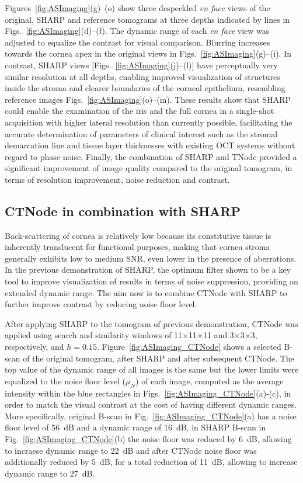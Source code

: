 Figures~\ref{fig:ASImaging}(g)--(o) show three despeckled \textit{en face} views of the original, SHARP and reference tomograms at three depths indicated by lines in Figs.~\ref{fig:ASImaging}(d)--(f). The dynamic range of each \textit{en face} view was adjusted to equalize the contrast for visual comparison. Blurring increases towards the cornea apex in the original views in Figs.~\ref{fig:ASImaging}(g)--(i). In contrast, SHARP views [Figs.~\ref{fig:ASImaging}(j)--(l)] have perceptually very similar resolution at all depths, enabling improved visualization of structures inside the stroma and clearer boundaries of the corneal epithelium, resembling reference images Figs.~\ref{fig:ASImaging}(o)--(m). These results show that SHARP could enable the examination of the iris and the full cornea in a single-shot acquisition with higher lateral resolution than currently possible, facilitating the accurate determination of parameters of clinical interest such as the stromal demarcation line and tissue layer thicknesses with existing OCT systems without regard to phase noise. Finally, the combination of SHARP and TNode provided a significant improvement of image quality compared to the original tomogram, in terms of resolution improvement, noise reduction and contrast.

\subsection{CTNode in combination with SHARP}

Back-scattering of cornea is relatively low because its constitutive tissue is inherently translucent for functional purposes, making that cornea stroma generally exhibits low to medium SNR, even lower in the presence of aberrations. In the previous demonstration of SHARP, the optimum filter shown to be a key tool to improve visualization of results in terms of noise suppression, providing an extended dynamic range. The aim now is to combine CTNode with SHARP to further improve contrast by reducing noise floor level.

After applying SHARP to the tomogram of previous demonstration, CTNode was applied using search and similarity windows of 11$\times$11$\times$11 and 3$\times$3$\times$3, respectively, and $h = 0.15$. Figure~\ref{fig:ASImaging_CTNode} shows a selected B-scan of the original tomogram, after SHARP and after subsequent CTNode. The top value of the dynamic range of all images is the same but the lower limits were equalized to the noise floor level ($\mu_N$) of each image, computed as the average intensity within the blue rectangles in Figs.~\ref{fig:ASImaging_CTNode}(a)-(c), in order to match the visual contrast at the cost of having different dynamic ranges. More specifically, original B-scan in Fig.~\ref{fig:ASImaging_CTNode}(a) has a noise floor level of 56~dB and a dynamic range of $16$~dB, in SHARP B-scan in Fig.~\ref{fig:ASImaging_CTNode}(b) the noise floor was reduced by 6~dB, allowing to incraese dynamic range to 22~dB and after CTNode noise floor was additionally reduced by 5~dB, for a total reduction of 11~dB, allowing to increase dynamic range to 27~dB.

